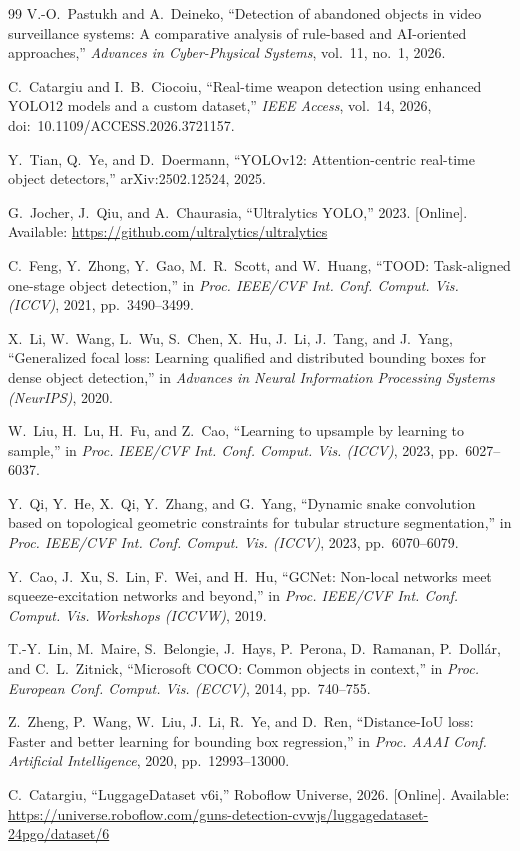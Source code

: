 \begin{thebibliography}{99}
V.-O.~Pastukh and A.~Deineko, ``Detection of abandoned objects in video
surveillance systems: A comparative analysis of rule-based and AI-oriented
approaches,'' \emph{Advances in Cyber-Physical Systems}, vol.~11, no.~1, 2026.

C.~Catargiu and I.~B.~Ciocoiu, ``Real-time weapon detection using enhanced
YOLO12 models and a custom dataset,'' \emph{IEEE Access}, vol.~14, 2026,
doi:~10.1109/ACCESS.2026.3721157.

Y.~Tian, Q.~Ye, and D.~Doermann, ``YOLOv12: Attention-centric real-time object
detectors,'' arXiv:2502.12524, 2025.

G.~Jocher, J.~Qiu, and A.~Chaurasia, ``Ultralytics YOLO,'' 2023. [Online].
Available: \url{https://github.com/ultralytics/ultralytics}

C.~Feng, Y.~Zhong, Y.~Gao, M.~R.~Scott, and W.~Huang, ``TOOD: Task-aligned
one-stage object detection,'' in \emph{Proc. IEEE/CVF Int. Conf. Comput. Vis.
(ICCV)}, 2021, pp.~3490--3499.

X.~Li, W.~Wang, L.~Wu, S.~Chen, X.~Hu, J.~Li, J.~Tang, and J.~Yang,
``Generalized focal loss: Learning qualified and distributed bounding boxes for
dense object detection,'' in \emph{Advances in Neural Information Processing
Systems (NeurIPS)}, 2020.

W.~Liu, H.~Lu, H.~Fu, and Z.~Cao, ``Learning to upsample by learning to
sample,'' in \emph{Proc. IEEE/CVF Int. Conf. Comput. Vis. (ICCV)}, 2023,
pp.~6027--6037.

Y.~Qi, Y.~He, X.~Qi, Y.~Zhang, and G.~Yang, ``Dynamic snake convolution based
on topological geometric constraints for tubular structure segmentation,'' in
\emph{Proc. IEEE/CVF Int. Conf. Comput. Vis. (ICCV)}, 2023, pp.~6070--6079.

Y.~Cao, J.~Xu, S.~Lin, F.~Wei, and H.~Hu, ``GCNet: Non-local networks meet
squeeze-excitation networks and beyond,'' in \emph{Proc. IEEE/CVF Int. Conf.
Comput. Vis. Workshops (ICCVW)}, 2019.

T.-Y.~Lin, M.~Maire, S.~Belongie, J.~Hays, P.~Perona, D.~Ramanan,
P.~Doll\'{a}r, and C.~L.~Zitnick, ``Microsoft COCO: Common objects in context,''
in \emph{Proc. European Conf. Comput. Vis. (ECCV)}, 2014, pp.~740--755.

Z.~Zheng, P.~Wang, W.~Liu, J.~Li, R.~Ye, and D.~Ren, ``Distance-IoU loss:
Faster and better learning for bounding box regression,'' in \emph{Proc. AAAI
Conf. Artificial Intelligence}, 2020, pp.~12993--13000.

C.~Catargiu, ``LuggageDataset v6i,'' Roboflow Universe, 2026. [Online].
Available: \url{https://universe.roboflow.com/guns-detection-cvwjs/luggagedataset-24pgo/dataset/6}

\end{thebibliography}
